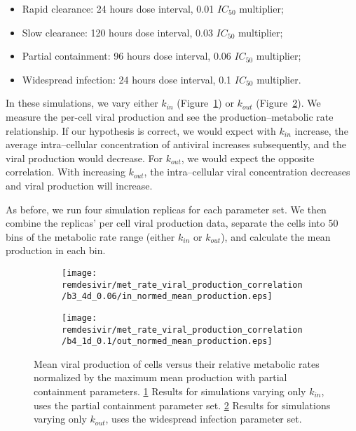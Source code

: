 \begin{itemize}
    \item Rapid clearance: 24 hours dose interval, 0.01 $IC_{50}$ multiplier;
    \item Slow clearance: 120 hours dose interval, 0.03 $IC_{50}$ multiplier;
    \item Partial containment: 96 hours dose interval, 0.06 $IC_{50}$ multiplier;
    \item Widespread infection: 24 hours dose interval, 0.1 $IC_{50}$ multiplier.
\end{itemize}

In these simulations, we vary either $k_{in}$ (Figure~\ref{fig:remdes:res:treat:super:in}) or $k_{out}$ (Figure~\ref{fig:remdes:res:treat:super:out}). We measure the per-cell viral production and see the production--metabolic rate relationship. If our hypothesis is correct, we would expect with $k_{in}$ increase, the average intra--cellular concentration of antiviral increases subsequently, and the viral production would decrease. For $k_{out}$, we would expect the opposite correlation. With increasing $k_{out}$, the intra--cellular viral concentration decreases and viral production will increase.

As before, we run four simulation replicas for each parameter set. We then combine the replicas' per cell viral production data, separate the cells into 50 bins of the metabolic rate range (either $k_{in}$ or $k_{out}$), and calculate the mean production in each bin.


\begin{figure}[H]
\centering
\begin{subfigure}[b]{0.48\textwidth}
\texttt{[image: remdesivir/met\_rate\_viral\_production\_correlation/b3\_4d\_0.06/in\_normed\_mean\_production.eps]}
\caption{}\label{fig:remdes:res:treat:super:in}
\end{subfigure}
%
\begin{subfigure}[b]{0.48\textwidth}
\texttt{[image: remdesivir/met\_rate\_viral\_production\_correlation/b4\_1d\_0.1/out\_normed\_mean\_production.eps]}
\caption{}\label{fig:remdes:res:treat:super:out}
\end{subfigure}
\caption{Mean viral production of cells versus their relative metabolic rates normalized by the maximum mean production with partial containment parameters.
 \ref{fig:remdes:res:treat:super:in} Results for simulations varying only $k_{in}$, uses the partial containment parameter set. \ref{fig:remdes:res:treat:super:out} Results for simulations varying only $k_{out}$, uses the widespread infection parameter set.}\label{fig:remdes:res:treat:super}
\end{figure}

